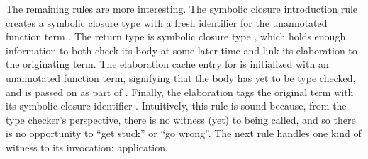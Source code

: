 The remaining rules are more interesting.
The symbolic closure introduction rule
\ltiSCUAbs creates a symbolic closure type with a fresh identifier \ltiClosureID{}
for the unannotated function term \ltiufun{\ltivar{}}{\ltiE{}}.
The return type is symbolic closure type
                       \ltiClosureWithStkID{\ltiEnv{}}
                                           {\ltiClosureID{}}
                                           {\ltiufun{\ltivar{}}{\ltiE{}}},
which holds enough information to both check its body at some later time
and link its elaboration to the originating term.
The elaboration cache entry for \ltiClosureID{} is initialized 
with an unannotated function term, signifying that the body has yet to be type checked,
and is passed on as part of \ltiCombinedThreadedEnvp{}.
Finally, the elaboration
                      {\ltiufunelab{\ltiClosureID{}}
                                   {\ltivar{}}
                                   {\ltiE{}}}
tags the original term with its symbolic closure identifier \ltiClosureID{}.
Intuitively, this rule is sound because, from the type checker's perspective,
there is no witness (yet) to \ltiufun{\ltivar{}}{\ltiE{}}
being called, and so there is no opportunity to ``get stuck'' or
``go wrong''. 
The next rule handles one kind of witness to its invocation: application.

